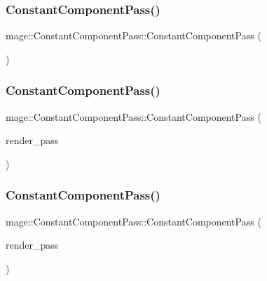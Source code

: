 \subsubsection{\texorpdfstring{Constant\+Component\+Pass()}{ConstantComponentPass()}\hspace{0.1cm}{\footnotesize\ttfamily [1/3]}}
{\footnotesize\ttfamily mage\+::\+Constant\+Component\+Pass\+::\+Constant\+Component\+Pass (\begin{DoxyParamCaption}{ }\end{DoxyParamCaption})}

\hypertarget{classmage_1_1_constant_component_pass_ac3112acde3a0504febef699873efe1ff}{}\label{classmage_1_1_constant_component_pass_ac3112acde3a0504febef699873efe1ff} 
\subsubsection{\texorpdfstring{Constant\+Component\+Pass()}{ConstantComponentPass()}\hspace{0.1cm}{\footnotesize\ttfamily [2/3]}}
{\footnotesize\ttfamily mage\+::\+Constant\+Component\+Pass\+::\+Constant\+Component\+Pass (\begin{DoxyParamCaption}\item[{const \hyperlink{classmage_1_1_constant_component_pass}{Constant\+Component\+Pass} \&}]{render\+\_\+pass }\end{DoxyParamCaption})\hspace{0.3cm}{\ttfamily [delete]}}

\hypertarget{classmage_1_1_constant_component_pass_a350d68fd2f8f17797361e7567d0337c7}{}\label{classmage_1_1_constant_component_pass_a350d68fd2f8f17797361e7567d0337c7} 
\subsubsection{\texorpdfstring{Constant\+Component\+Pass()}{ConstantComponentPass()}\hspace{0.1cm}{\footnotesize\ttfamily [3/3]}}
{\footnotesize\ttfamily mage\+::\+Constant\+Component\+Pass\+::\+Constant\+Component\+Pass (\begin{DoxyParamCaption}\item[{\hyperlink{classmage_1_1_constant_component_pass}{Constant\+Component\+Pass} \&\&}]{render\+\_\+pass }\end{DoxyParamCaption})\hspace{0.3cm}{\ttfamily [default]}}

